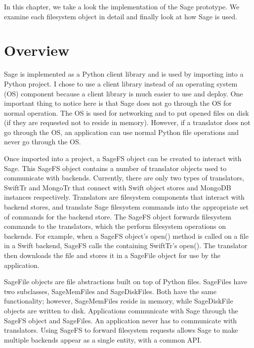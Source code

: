 \label{chapter:imp}

In this chapter, we take a look the implementation of the Sage prototype. We examine each filesystem object in detail and finally look at how Sage is used.

\section{Overview}

Sage is implemented as a Python client library and is used by importing into a Python project. I chose to use a client library instead of an operating system (OS) component because a client library is much easier to use and deploy. One important thing to notice here is that Sage does not go through the OS for normal operation.  The OS is used for networking and to put opened files on disk (if they are requested not to  reside in memory). However, if a translator does not go through the OS, an application can use normal Python file operations and never go through the OS. 

Once imported into a project, a SageFS object can be created to interact with Sage. This SageFS object contains a number of translator objects used to communicate with backends. Currently, there are only two types of translators, SwiftTr and MongoTr that connect with Swift object stores and MongoDB instances respectively. Translators are filesystem components that interact with backend stores, and translate Sage filesystem commands into the appropriate set of commands for the backend store. The SageFS object forwards filesystem commands to the translators, which the perform filesystem operations on backends. For example, when a SageFS object's open() method is called on a file in a Swift backend, SageFS calls the containing  SwiftTr's open(). The translator then downloads the file and stores it in a SageFile object for use by the application.  

SageFile objects are file abstractions built on top of Python files. SageFiles have two subclasses, SageMemFiles and SageDiskFiles. Both have the same functionality; however, SageMemFiles reside in memory, while SageDiskFile objects are written to disk. Applications communicate with Sage through the SageFS object and SageFiles. An application never has to communicate with translators. Using SageFS to forward filesystem requests allows Sage to make multiple backends appear as a single entity, with a common API.


